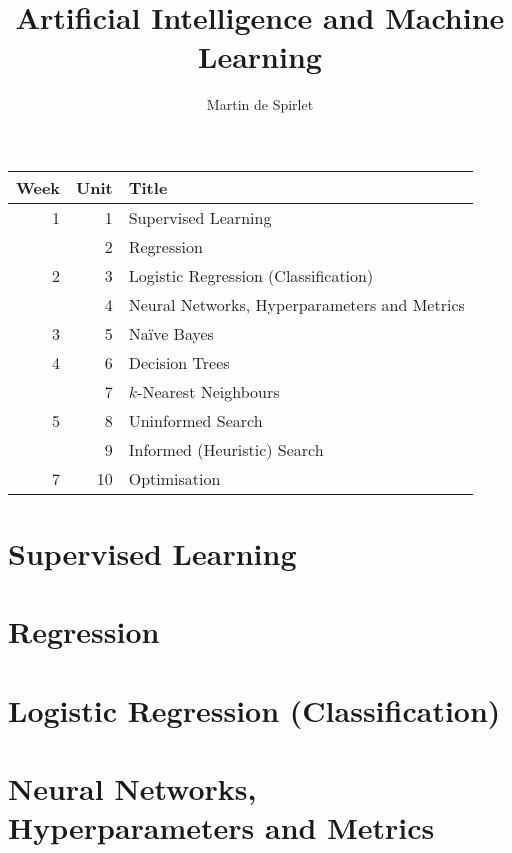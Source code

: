 \documentclass[
  11pt,
  a4paper,
]{article}
\title{Artificial Intelligence and Machine Learning}
\author{Martin de Spirlet}
\date{}
\begin{document}

\maketitle

\vspace*{\fill}

\begin{table}[htp]
  \centering
  \begin{tabular}{rrl}
    \toprule
    Week & Unit & Title \\
    \midrule
    1 &  1 & Supervised Learning \\
      &  2 & Regression \\ [1ex]
    2 &  3 & Logistic Regression (Classification) \\
      &  4 & Neural Networks, Hyperparameters and Metrics \\ [1ex]
    3 &  5 & Na\"{i}ve Bayes \\ [1ex]
    4 &  6 & Decision Trees \\
      &  7 & \( k \)-Nearest Neighbours \\ [1ex]
    5 &  8 & Uninformed Search \\
      &  9 & Informed (Heuristic) Search \\ [1ex]
    7 & 10 & Optimisation \\
    \bottomrule
  \end{tabular}
\end{table}

\vspace*{\fill}
\addvspace{1in}

\clearpage


\section{Supervised Learning}


\section{Regression}


\section{Logistic Regression (Classification)}


\section{Neural Networks, Hyperparameters and Metrics}

\end{document}
